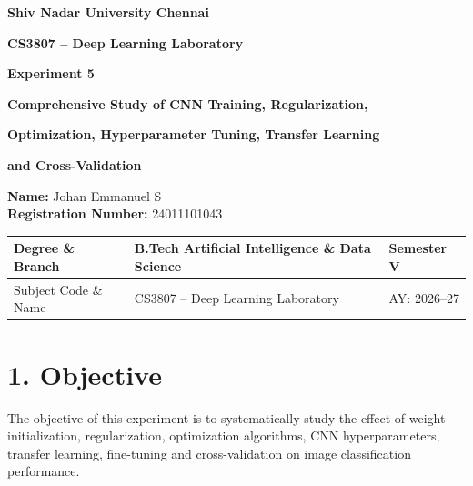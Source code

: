 \documentclass[10pt]{article}
\begin{document}

\begin{center}

{\large\textbf{Shiv Nadar University Chennai}}

\vspace{2mm}

{\normalsize\textbf{CS3807 -- Deep Learning Laboratory}}

\vspace{2mm}

{\large\textbf{Experiment 5}}

\vspace{1mm}

{\normalsize\textbf{Comprehensive Study of CNN Training, Regularization,}}

{\normalsize\textbf{Optimization, Hyperparameter Tuning, Transfer Learning}}

{\normalsize\textbf{and Cross-Validation}}

\end{center}

\begin{flushleft}
\textbf{Name:} Johan Emmanuel S\\
\textbf{Registration Number:} 24011101043\\
\end{flushleft}

\vspace{3mm}

\begin{tabular}{|p{3.4cm}|p{9.0cm}|p{1.4cm}|}
\hline
Degree \& Branch &
B.Tech Artificial Intelligence \& Data Science &
Semester V\\
\hline
Subject Code \& Name &
CS3807 -- Deep Learning Laboratory &
AY: 2026--27\\
\hline
\end{tabular}

\section*{1. Objective}

The objective of this experiment is to systematically study the effect of
weight initialization, regularization, optimization algorithms, CNN
hyperparameters, transfer learning, fine-tuning and cross-validation on
image classification performance.
\end{document}
